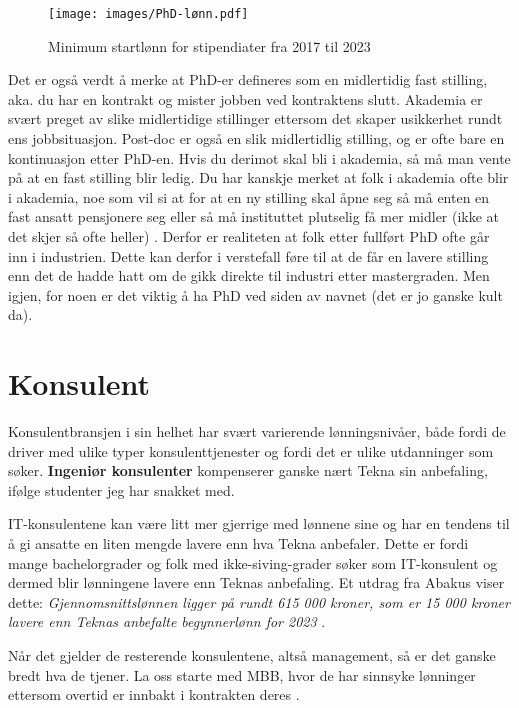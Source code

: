 \begin{figure}[H]
    \centering
    \texttt{[image: images/PhD-lønn.pdf]}
    \caption{Minimum startlønn for stipendiater fra 2017 til 2023\cite{PHD}}
    \label{fig:PHD-lønn}
\end{figure}

Det er også verdt å merke at PhD-er defineres som en midlertidig fast stilling, aka. du har en kontrakt og mister jobben ved kontraktens slutt. Akademia er svært preget av slike midlertidige stillinger ettersom det skaper usikkerhet rundt ens jobbsituasjon. Post-doc er også en slik midlertidlig stilling, og er ofte bare en kontinuasjon etter PhD-en. Hvis du derimot skal bli i akademia, så må man vente på at en fast stilling blir ledig. Du har kanskje merket at folk i akademia ofte blir i akademia, noe som vil si at for at en ny stilling skal åpne seg så må enten en fast ansatt pensjonere seg eller så må instituttet plutselig få mer midler (ikke at det skjer så ofte heller) \cite{Tonnessen2023}. Derfor er realiteten at folk etter fullført PhD ofte går inn i industrien. Dette kan derfor i verstefall føre til at de får en lavere stilling enn det de hadde hatt om de gikk direkte til industri etter mastergraden. Men igjen, for noen er det viktig å ha PhD ved siden av navnet (det er jo ganske kult da). 


\section{Konsulent}

Konsulentbransjen i sin helhet har svært varierende lønningsnivåer, både fordi de driver med ulike typer konsulenttjenester og fordi det er ulike utdanninger som søker. \textbf{Ingeniør konsulenter} kompenserer ganske nært Tekna sin anbefaling, ifølge studenter jeg har snakket med. 

IT-konsulentene kan være litt mer gjerrige med lønnene sine og har en tendens til å gi ansatte en liten mengde lavere enn hva Tekna anbefaler. Dette er fordi mange bachelorgrader og folk med ikke-siving-grader søker som IT-konsulent og dermed blir lønningene lavere enn Teknas anbefaling. Et utdrag fra Abakus viser dette: \textit{Gjennomsnittslønnen ligger på rundt 615 000 kroner, som er 15 000 kroner lavere enn Teknas anbefalte begynnerlønn for 2023} \cite{abakus_utmatrikuleringsundersokelse}.  

Når det gjelder de resterende konsulentene, altså management, så er det ganske bredt hva de tjener. La oss starte med MBB, hvor de har sinnsyke lønninger ettersom overtid er innbakt i kontrakten deres \cite{dn_nyutdannede_konsulenter}. 

